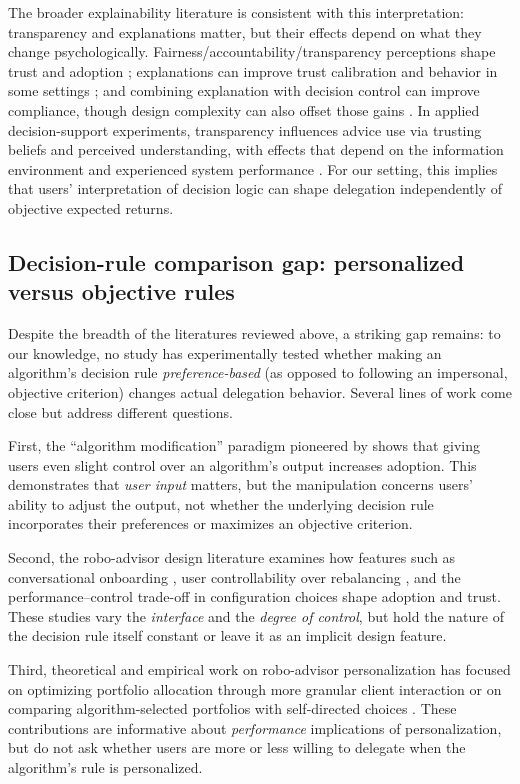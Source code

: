 \documentclass[a4paper, 12pt, fleqn]{article}
\theoremstyle{definition}
\begin{document}
The broader explainability literature is consistent with this interpretation: transparency and explanations matter, but their effects depend on what they change psychologically. Fairness/accountability/transparency perceptions shape trust and adoption \citep{Shin2019}; explanations can improve trust calibration and behavior in some settings \citep{Leichtmann2023}; and combining explanation with decision control can improve compliance, though design complexity can also offset those gains \citep{Westphal2023}. In applied decision-support experiments, transparency influences advice use via trusting beliefs and perceived understanding, with effects that depend on the information environment and experienced system performance \citep{Ning2024,Sun2026}. For our setting, this implies that users' interpretation of decision logic can shape delegation independently of objective expected returns.

\subsection{Decision-rule comparison gap: personalized versus objective rules}
Despite the breadth of the literatures reviewed above, a striking gap remains: to our knowledge, no study has experimentally tested whether making an algorithm's decision rule \emph{preference-based} (as opposed to following an impersonal, objective criterion) changes actual delegation behavior. Several lines of work come close but address different questions.

First, the ``algorithm modification'' paradigm pioneered by \citet{Dietvorst2018} shows that giving users even slight control over an algorithm's output increases adoption. This demonstrates that \emph{user input} matters, but the manipulation concerns users' ability to adjust the output, not whether the underlying decision rule incorporates their preferences or maximizes an objective criterion.

Second, the robo-advisor design literature examines how features such as conversational onboarding \citep{Hildebrand2021}, user controllability over rebalancing \citep{Kim2025ICIS}, and the performance--control trade-off in configuration choices \citep{Ruehr2020} shape adoption and trust. These studies vary the \emph{interface} and the \emph{degree of control}, but hold the nature of the decision rule itself constant or leave it as an implicit design feature.

Third, theoretical and empirical work on robo-advisor personalization has focused on optimizing portfolio allocation through more granular client interaction \citep{Capponi2022} or on comparing algorithm-selected portfolios with self-directed choices \citep{BouluReshef2026}. These contributions are informative about \emph{performance} implications of personalization, but do not ask whether users are more or less willing to delegate when the algorithm's rule is personalized.
\end{document}
